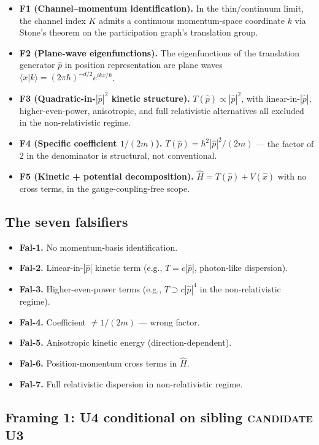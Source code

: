 \documentclass[11pt,a4paper]{article}
\begin{document}
\begin{itemize}
  \item \textbf{F1 (Channel--momentum identification).} In the thin/continuum limit, the channel index $K$ admits a continuous momentum-space coordinate $k$ via Stone's theorem on the participation graph's translation group.
  \item \textbf{F2 (Plane-wave eigenfunctions).} The eigenfunctions of the translation generator $\hat{p}$ in position representation are plane waves $\langle x | k \rangle = (2\pi\hbar)^{-d/2} e^{i k x / \hbar}$.
  \item \textbf{F3 (Quadratic-in-$|\hat{p}|^2$ kinetic structure).} $T(\hat{p}) \propto |\hat{p}|^2$, with linear-in-$|\hat{p}|$, higher-even-power, anisotropic, and full relativistic alternatives all excluded in the non-relativistic regime.
  \item \textbf{F4 (Specific coefficient $1/(2m)$).} $T(\hat{p}) = \hbar^2 |\hat{p}|^2 / (2m)$ --- the factor of 2 in the denominator is structural, not conventional.
  \item \textbf{F5 (Kinetic + potential decomposition).} $\hat{H} = T(\hat{p}) + V(\hat{x})$ with no cross terms, in the gauge-coupling-free scope.
\end{itemize}

\subsection{The seven falsifiers}

\begin{itemize}
  \item \textbf{Fal-1.} No momentum-basis identification.
  \item \textbf{Fal-2.} Linear-in-$|\hat{p}|$ kinetic term (e.g., $T = c |\hat{p}|$, photon-like dispersion).
  \item \textbf{Fal-3.} Higher-even-power terms (e.g., $T \supset c |\hat{p}|^4$ in the non-relativistic regime).
  \item \textbf{Fal-4.} Coefficient $\neq 1/(2m)$ --- wrong factor.
  \item \textbf{Fal-5.} Anisotropic kinetic energy (direction-dependent).
  \item \textbf{Fal-6.} Position-momentum cross terms in $\hat{H}$.
  \item \textbf{Fal-7.} Full relativistic dispersion in non-relativistic regime.
\end{itemize}

\subsection{Framing 1: U4 conditional on sibling \textsc{candidate} U3}
\end{document}
